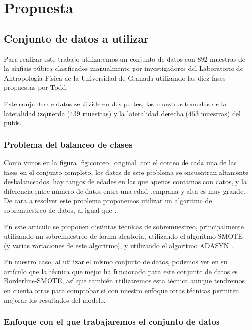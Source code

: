 \section{Propuesta}

\subsection{Conjunto de datos a utilizar}

Para realizar este trabajo utilizaremos un conjunto de datos con $892$ muestras de la sínfisis púbica clasificados manualmente por investigadores del Laboratorio de Antropología Física de la Universidad de Granada utilizando las diez fases propuestas por Todd.

Este conjunto de datos se divide en dos partes, las muestras tomadas de la lateralidad izquierda ($439$ muestras) y la lateralidad derecha ($453$ muestras) del pubis.

\subsubsection{Problema del balanceo de clases}

Como vimos en la figura \ref{fig:conteo_original} con el conteo de cada una de las fases en el conjunto completo, los datos de este problema se encuentran altamente desbalanceados, hay rangos de edades en las que apenas contamos con datos, y la diferencia entre número de datos entre una edad temprana y alta es muy grande. De cara a resolver este problema proponemos utilizar un algoritmo de sobremuestreo de datos, al igual que \cite{NSLVOrdAge}.

En este artículo se proponen distintas técnicas de sobremuestreo, principalmente utilizando un sobremuestreo de forma aleatoria, utilizando el algoritmo SMOTE \cite{revisionSMOTE} (y varias variaciones de este algoritmo), y utilizando el algoritmo ADASYN \cite{propuestaADASYN}.

En nuestro caso, al utilizar el mismo conjunto de datos, podemos ver en su artículo que la técnica que mejor ha funcionado para este conjunto de datos es Borderline-SMOTE, así que también utilizaremos esta técnica aunque tendremos en cuenta otras para comprobar si con nuestro enfoque otras técnicas permiten mejorar los resultados del modelo.

\subsubsection{Enfoque con el que trabajaremos el conjunto de datos}


